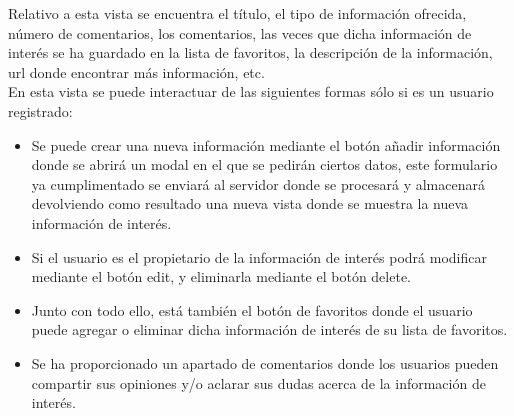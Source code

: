 Relativo a esta vista se encuentra el título, el tipo de información ofrecida, número de comentarios, los comentarios, las veces que dicha información de interés se ha guardado en la lista de favoritos, la descripción de la información, url donde encontrar más información, etc.\\
En esta vista se puede interactuar de las siguientes formas sólo si es un usuario registrado:
\begin{itemize}
\item Se puede crear una nueva información  mediante el botón añadir información donde se abrirá un modal en el que se pedirán ciertos datos, este formulario ya cumplimentado se enviará al servidor donde se procesará y almacenará devolviendo como resultado una nueva vista donde se muestra la nueva información de interés.
\item Si el usuario es el propietario de la información de interés podrá modificar mediante el botón edit, y eliminarla mediante el botón delete.
\item Junto con todo ello, está también el botón de favoritos donde el usuario puede agregar o eliminar dicha información de interés de su lista de favoritos.  
\item Se ha proporcionado un apartado de comentarios donde los usuarios pueden compartir sus opiniones y/o aclarar sus dudas acerca de la información de interés.
\end{itemize}

